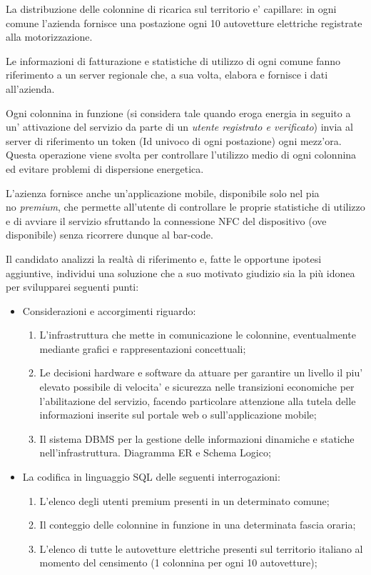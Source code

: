 \documentclass[a4paper,12pt]{article}
\begin{document}
La distribuzione delle colonnine di ricarica sul territorio e' capillare: in
ogni comune l'azienda fornisce una postazione ogni 10 autovetture elettriche 
registrate alla motorizzazione.

Le informazioni di fatturazione e statistiche di utilizzo di ogni comune fanno
riferimento a un server regionale che, a sua volta, elabora e fornisce 
i dati all'azienda.

Ogni colonnina in funzione (si considera tale quando eroga energia in seguito a
un' attivazione del servizio da parte di un \textit{utente registrato 
e verificato}) invia al server di riferimento un token (Id univoco di ogni 
postazione) ogni mezz'ora.\\ Questa operazione viene svolta per controllare
l'utilizzo medio di ogni colonnina ed evitare problemi di dispersione
energetica.

L'azienza fornisce anche un'applicazione mobile, disponibile solo nel
pia\\no \textit{premium}, che permette all'utente di controllare le proprie
statistiche di utilizzo e di avviare il servizio sfruttando la connessione NFC
del dispositivo (ove disponibile) senza ricorrere dunque al bar-code.

Il candidato analizzi la realtà di riferimento e, fatte le opportune ipotesi 
aggiuntive, individui una
soluzione che a suo motivato giudizio sia la più idonea 
per svilupparei seguenti punti: 

\begin{itemize}
\item Considerazioni e accorgimenti riguardo:
\begin{enumerate}
\item L'infrastruttura che mette in comunicazione le colonnine, eventualmente
mediante grafici e rappresentazioni concettuali;
\item Le decisioni hardware e software da attuare per garantire 
un livello il piu' elevato possibile di velocita' e sicurezza nelle transizioni
economiche per l'abilitazione del servizio, facendo particolare attenzione
alla tutela delle informazioni inserite sul portale web o sull'applicazione 
mobile;
\item Il sistema DBMS per la gestione delle informazioni dinamiche e statiche
nell'infrastruttura. Diagramma ER e Schema Logico;
\end{enumerate}
\item La codifica in linguaggio SQL delle seguenti interrogazioni:
\begin{enumerate}
\item L'elenco degli utenti premium presenti in un determinato comune;
\item Il conteggio delle colonnine in funzione in una determinata fascia oraria;
\item L'elenco di tutte le autovetture elettriche presenti sul territorio 
italiano al momento del censimento (1 colonnina per ogni 10 autovetture);
\end{enumerate}
\end{itemize}
\end{document}
